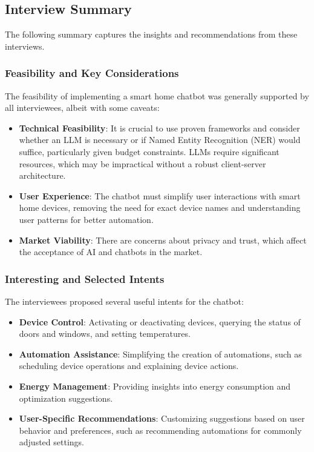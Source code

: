 \subsection{Interview Summary}
\label{sec:interview_summary}

The following summary captures the insights and recommendations from these interviews.

\subsubsection{Feasibility and Key Considerations}

The feasibility of implementing a smart home chatbot was generally supported by all interviewees, albeit with some caveats:

\begin{itemize}
    \item \textbf{Technical Feasibility}: It is crucial to use proven frameworks and consider whether an LLM is necessary or if Named Entity Recognition (NER) would suffice, particularly given budget constraints. LLMs require significant resources, which may be impractical without a robust client-server architecture.
    \item \textbf{User Experience}: The chatbot must simplify user interactions with smart home devices, removing the need for exact device names and understanding user patterns for better automation.
    \item \textbf{Market Viability}: There are concerns about privacy and trust, which affect the acceptance of AI and chatbots in the market.
\end{itemize}

\subsubsection{Interesting and Selected Intents}

The interviewees proposed several useful intents for the chatbot:

\begin{itemize}
    \item \textbf{Device Control}: Activating or deactivating devices, querying the status of doors and windows, and setting temperatures.
    \item \textbf{Automation Assistance}: Simplifying the creation of automations, such as scheduling device operations and explaining device actions.
    \item \textbf{Energy Management}: Providing insights into energy consumption and optimization suggestions.
    \item \textbf{User-Specific Recommendations}: Customizing suggestions based on user behavior and preferences, such as recommending automations for commonly adjusted settings.
\end{itemize}


